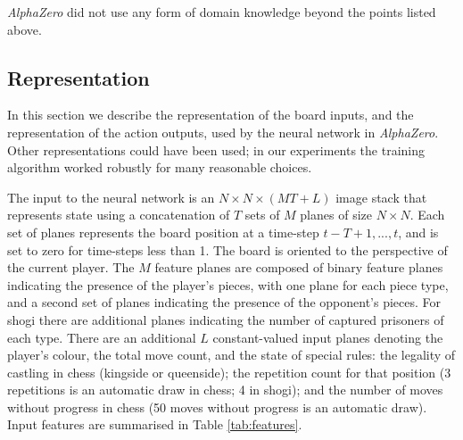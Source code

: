 \documentclass[12pt]{article}
\begin{document}
\emph{AlphaZero} did not use any form of domain knowledge beyond the points listed above. 

\subsection*{Representation}

In this section we describe the representation of the board inputs, and the representation of the action outputs, used by the neural network in \emph{AlphaZero}. Other representations could have been used; in our experiments the training algorithm worked robustly for many reasonable choices.

The input to the neural network is an $N \times N \times (M T + L)$ image stack that represents state using a concatenation of $T$ sets of $M$ planes of size $N \times N$. Each set of planes represents the board position at a time-step $t - T + 1, ..., t$, and is set to zero for time-steps less than 1. The board is oriented to the perspective of the current player. The $M$ feature planes are composed of binary feature planes indicating the presence of the player's pieces, with one plane for each piece type, and a second set of planes indicating the presence of the opponent's pieces. For shogi there are additional planes indicating the number of captured prisoners of each type. There are an additional $L$  constant-valued input planes denoting the player's colour, the total move count, and the state of special rules: the legality of castling in chess (kingside or queenside); the repetition count for that position (3 repetitions is an automatic draw in chess; 4 in shogi); and the number of moves without progress in chess (50 moves without progress is an automatic draw). Input features are summarised in Table \ref{tab:features}.
\end{document}
